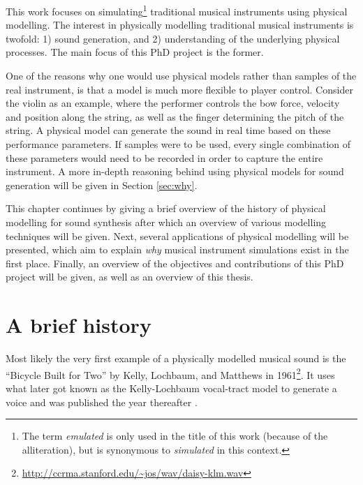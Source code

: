 This work focuses on simulating\footnote{The term \textit{emulated} is only used in the title of this work (because of the alliteration), but is synonymous to \textit{simulated} in this context.} traditional musical instruments using physical modelling. 
The interest in physically modelling traditional musical instruments is twofold: 1) sound generation, and 2) understanding of the underlying physical processes. The main focus of this PhD project is the former. 

One of the reasons why one would use physical models rather than samples of the real instrument, is that a model is much more flexible to player control. Consider the violin as an example, where the performer controls the bow force, velocity and position along the string, as well as the finger determining the pitch of the string. A physical model can generate the sound in real time based on these performance parameters. If samples were to be used, every single combination of these parameters would need to be recorded in order to capture the entire instrument. A more in-depth reasoning behind using physical models for sound generation will be given in Section \ref{sec:why}.

This chapter continues by giving a brief overview of the history of physical modelling for sound synthesis after which an overview of various modelling techniques will be given. Next, several applications of physical modelling will be presented, which aim to explain \textit{why} musical instrument simulations exist in the first place. Finally, an overview of the objectives and contributions of this PhD project will be given, as well as an overview of this thesis.

\section{A brief history}\label{sec:history}


Most likely the very first example of a physically modelled musical sound is the ``Bicycle Built for Two'' by Kelly, Lochbaum, and Matthews in 1961\footnote{\url{http://ccrma.stanford.edu/~jos/wav/daisy-klm.wav}}. It uses what later got known as the Kelly-Lochbaum vocal-tract model to generate a voice and was published the year thereafter \cite{Kelly1962}. 

